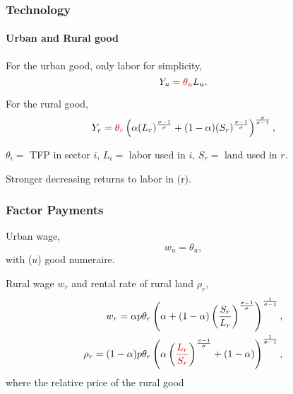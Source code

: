 \documentclass[aspectratio=169]{beamer}
\begin{document}
\begin{v75mins}
\begin{frame}
\frametitle{Technology}
\framesubtitle{Urban and Rural good}
\begin{midi}
\item For the urban good, only labor for simplicity,
\begin{equation*}
Y_u=\re{\theta_u}L_u.
\end{equation*}
\item For the rural good,
\begin{equation*}
Y_r=\re{\theta_r}\left(\alpha (L_r)^{\frac{\sigma-1}{\sigma}} +(1-\alpha)(S_r)^{\frac{\sigma-1}{\sigma}} \right)^{\frac{\sigma}{\sigma-1}},
\end{equation*}
\item $\theta_i=$ TFP in sector $i$, $L_i=$ labor used in $i$, $S_r=$ land used in $r$.
\item {}
\item Stronger decreasing returns to labor in (r).
\end{midi}

\end{frame}


\begin{frame}
\frametitle{Factor Payments}

Urban wage,
\begin{equation*}w_u=\theta_u, \end{equation*}
with ($u$) good numeraire.

\bigskip
\pause
Rural wage $w_r$ and rental rate of rural land $\rho_r$,
\vspace{-0.5cm}
\begin{eqnarray*}
w_r=\alpha p\theta_r\left(\alpha  +(1-\alpha)\left(\frac{S_r}{L_r}\right)^{\frac{\sigma-1}{\sigma}} \right)^{\frac{1}{\sigma-1}}, \\
\rho_r=(1-\alpha)p\theta_r\left(\alpha \left(\re{\frac{L_r}{S_r}}\right)^{\frac{\sigma-1}{\sigma}} +(1-\alpha) \right)^{\frac{1}{\sigma-1}},
\end{eqnarray*}
where  the relative price of the rural good\\
\end{frame}


\end{v75mins}
\end{document}
